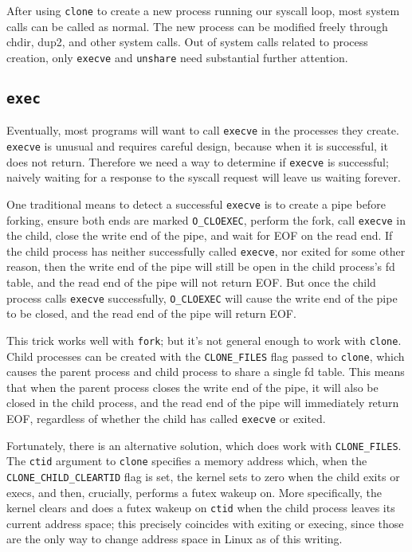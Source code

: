 \documentclass[sigplan]{acmart}
\begin{document}
After using \texttt{clone} to create a new process running our syscall loop,
most system calls can be called as normal.
The new process can be modified freely through chdir, dup2, and other system calls.
Out of system calls related to process creation,
only \texttt{execve} and \texttt{unshare} need substantial further attention.
\subsection{\texttt{exec}}
Eventually, most programs will want to call \texttt{execve} in the processes they create.
\texttt{execve} is unusual and requires careful design,
because when it is successful, it does not return.
Therefore we need a way to determine if \texttt{execve} is successful;
naively waiting for a response to the syscall request will leave us waiting forever.

One traditional means to detect a successful \texttt{execve} is to create a pipe before forking,
ensure both ends are marked \verb|O_CLOEXEC|,
perform the fork,
call \texttt{execve} in the child,
close the write end of the pipe,
and wait for EOF on the read end.
If the child process has neither successfully called \texttt{execve}, nor exited for some other reason,
then the write end of the pipe will still be open in the child process's fd table,
and the read end of the pipe will not return EOF.
But once the child process calls \texttt{execve} successfully,
\verb|O_CLOEXEC| will cause the write end of the pipe to be closed,
and the read end of the pipe will return EOF.

This trick works well with \texttt{fork};
but it's not general enough to work with \texttt{clone}.
Child processes can be created with the \verb|CLONE_FILES| flag passed to \texttt{clone},
which causes the parent process and child process to share a single fd table.
This means that when the parent process closes the write end of the pipe,
it will also be closed in the child process,
and the read end of the pipe will immediately return EOF,
regardless of whether the child has called \texttt{execve} or exited.

Fortunately, there is an alternative solution, which does work with \verb|CLONE_FILES|.
The \texttt{ctid} argument to \texttt{clone} specifies a memory address which,
when the \verb|CLONE_CHILD_CLEARTID| flag is set,
the kernel sets to zero when the child exits or execs,
and then, crucially, performs a futex wakeup on.
More specifically,
the kernel clears and does a futex wakeup on \texttt{ctid} when the child process leaves its current address space;
this precisely coincides with exiting or execing,
since those are the only way to change address space in Linux as of this writing.
\end{document}

